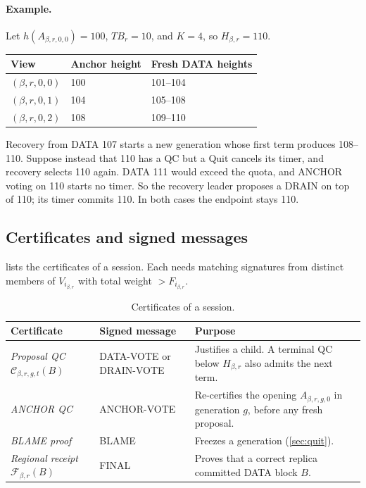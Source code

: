 \documentclass[11pt,a4paper]{article}
\newcommand{\QC}{\mathcal C}
\newcommand{\FC}{\mathcal F}
\newcommand{\TB}{\mathit{TB}}
\newcommand{\defterm}[1]{\textcolor{rrBlue}{\textit{#1}}}
\begin{document}
\paragraph{Example.}
Let $h(A_{\beta,r,0,0})=100$, $\TB_r=10$, and $K=4$, so $H_{\beta,r}=110$.
\begin{center}\small
\begin{tabular}{@{}lll@{}}\toprule
View & Anchor height & Fresh DATA heights\\\midrule
$(\beta,r,0,0)$ & 100 & 101--104\\
$(\beta,r,0,1)$ & 104 & 105--108\\
$(\beta,r,0,2)$ & 108 & 109--110\\\bottomrule
\end{tabular}
\end{center}
Recovery from DATA 107 starts a new generation whose first term produces
108--110. Suppose instead that 110 has a QC but a Quit cancels its timer,
and recovery selects 110 again. DATA 111 would exceed the quota, and
ANCHOR voting on 110 starts no timer. So the recovery leader proposes a
DRAIN on top of 110; its timer commits 110. In both cases the endpoint
stays 110.

\subsection{Certificates and signed messages}
\label{sec:certificates}
 lists the certificates of a session. Each needs
matching signatures from distinct members of $V_{i_{\beta,r}}$ with total
weight $>F_{i_{\beta,r}}$.

\begin{table}[htbp]\centering\small
\caption{Certificates of a session.}
\label{tab:certificates}
\begin{tabularx}{\linewidth}{@{}>{\raggedright\arraybackslash}p{.25\linewidth}>{\raggedright\arraybackslash}p{.24\linewidth}Y@{}}
\toprule
Certificate & Signed message & Purpose\\
\midrule
\defterm{Proposal QC} $\QC_{\beta,r,g,t}(B)$ & DATA-VOTE or DRAIN-VOTE & Justifies a
child. A terminal QC below $H_{\beta,r}$ also admits the next term.\\
\defterm{ANCHOR QC} & ANCHOR-VOTE & Re-certifies the opening $A_{\beta,r,g,0}$ in
generation $g$, before any fresh proposal.\\
\defterm{BLAME proof} & BLAME & Freezes a generation (\cref{sec:quit}).\\
\defterm{Regional receipt} $\FC_{\beta,r}(B)$ & FINAL & Proves that a correct replica
committed DATA block $B$.\\
\bottomrule
\end{tabularx}
\end{table}
\end{document}
